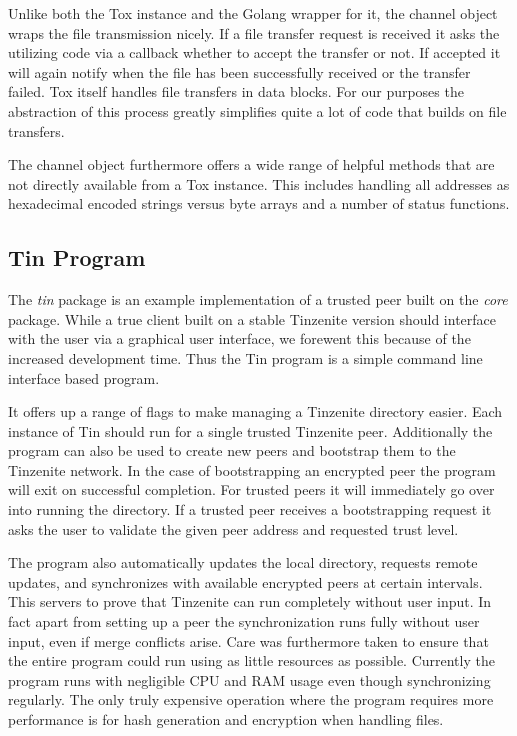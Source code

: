Unlike both the Tox instance and the Golang wrapper for it, the channel object wraps the file transmission nicely.
If a file transfer request is received it asks the utilizing code via a callback whether to accept the transfer or not.
If accepted it will again notify when the file has been successfully received or the transfer failed.
Tox itself handles file transfers in data blocks.
For our purposes the abstraction of this process greatly simplifies quite a lot of code that builds on file transfers.

The channel object furthermore offers a wide range of helpful methods that are not directly available from a Tox instance.
This includes handling all addresses as hexadecimal encoded strings versus byte arrays and a number of status functions.

\subsection{Tin Program}
\label{sub:Tin Program}

The \emph{tin} package is an example implementation of a trusted peer built on the \emph{core} package.
While a true client built on a stable Tinzenite version should interface with the user via a graphical user interface, we forewent this because of the increased development time.
Thus the Tin program is a simple command line interface based program.

It offers up a range of flags to make managing a Tinzenite directory easier.
Each instance of Tin should run for a single trusted Tinzenite peer.
Additionally the program can also be used to create new peers and bootstrap them to the Tinzenite network.
In the case of bootstrapping an encrypted peer the program will exit on successful completion.
For trusted peers it will immediately go over into running the directory.
If a trusted peer receives a bootstrapping request it asks the user to validate the given peer address and requested trust level.

The program also automatically updates the local directory, requests remote updates, and synchronizes with available encrypted peers at certain intervals.
This servers to prove that Tinzenite can run completely without user input.
In fact apart from setting up a peer the synchronization runs fully without user input, even if merge conflicts arise.
Care was furthermore taken to ensure that the entire program could run using as little resources as possible.
Currently the program runs with negligible CPU and RAM usage even though synchronizing regularly.
The only truly expensive operation where the program requires more performance is for hash generation and encryption when handling files.

